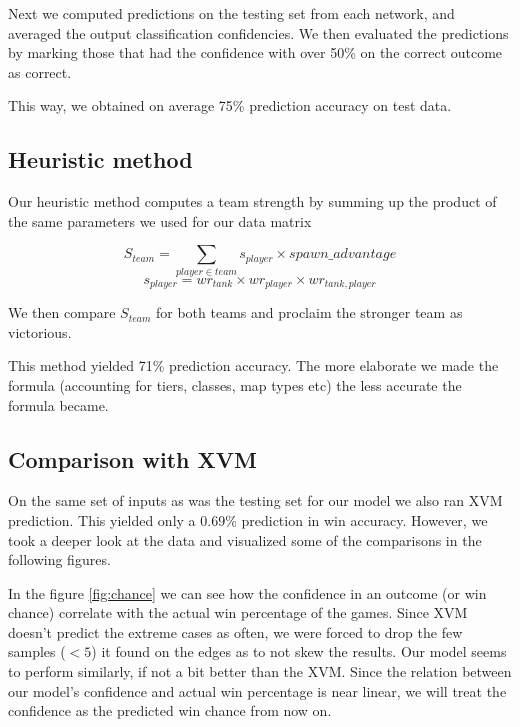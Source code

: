\documentclass{report}
\begin{document}
Next we computed predictions on the testing set from each network, and averaged the output classification confidencies. We then evaluated the predictions by marking those 
that had the confidence with over 50\% on the correct outcome as correct.

This way, we obtained on average 75\% prediction accuracy on test data. 

\subsection{Heuristic method}

Our heuristic method computes a team strength by summing up the product of the same parameters we used for our data matrix

$$S_{team} = \sum_{player \in team}{s_{player}} \times spawn\_advantage$$
$$s_{player} = wr_{tank} \times wr_{player} \times wr_{tank,player}$$

We then compare $S_{team}$ for both teams and proclaim the stronger team as victorious.

This method yielded 71\% prediction accuracy. The more elaborate we made the formula (accounting for tiers, classes, map types etc) the less accurate the formula became.

\subsection{Comparison with XVM}

On the same set of inputs as was the testing set for our model we also ran XVM prediction.
This yielded only a 0.69\% prediction in win accuracy. However, we took a deeper look at the data and visualized some of the comparisons in the following figures.

In the figure \ref{fig:chance} we can see how the confidence in an outcome (or win chance) correlate with the actual win percentage of the games. Since XVM doesn't predict the extreme cases as often, we were forced to drop the few samples ($< 5$) it found on the edges as to not skew the results. 
Our model seems to perform similarly, if not a bit better than the XVM. Since the relation between our model's confidence and actual win percentage is near linear, we will treat the confidence as the predicted win chance from now on.
\end{document}
